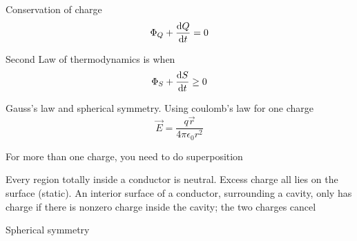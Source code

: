 Conservation of charge
\begin{equation}
\Phi_Q + \frac{\operatorname{d\!} Q}{\operatorname{d\!} t} = 0
\end{equation}

Second Law of thermodynamics is when
\begin{equation}
\Phi_S + \frac{\operatorname{d\!} S}{\operatorname{d\!} t} \geq 0
\end{equation}

Gauss's law and spherical symmetry. Using coulomb's law for one charge
\begin{equation}
\vec{E} = \frac{q \vec{r}}{4 \pi \epsilon_0 r^2}
\end{equation}

For more than one charge, you need to do superposition

Every region totally inside a conductor is neutral. Excess charge all lies on the surface (static). An interior surface of a conductor, surrounding a cavity, only has charge if there is nonzero charge inside the cavity; the two charges cancel

Spherical symmetry
